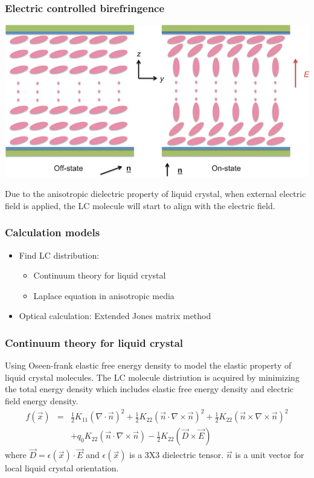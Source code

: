 \documentclass{beamer}
\begin{document}
\begin{frame}
\frametitle{Electric controlled birefringence}
\begin{center}
\includegraphics[scale=0.4]{ECB.jpg}
\end{center}
Due to the anisotropic dielectric property of liquid crystal, when external electric field is applied, the LC molecule will start to align with the electric field.
\end{frame}
\begin{frame}
\frametitle{Calculation models}
\begin{itemize}
\item<1-> Find LC distribution:
\begin{itemize}
\item<1-> Continuum theory for liquid crystal
\item<1-> Laplace equation in anisotropic media
\end{itemize}
\item<1-> Optical calculation: Extended Jones matrix method
\end{itemize}
\end{frame}
\begin{frame}
\frametitle{Continuum theory for liquid crystal}
Using Oseen-frank elastic free energy density to model the elastic property of liquid crystal molecules.
The LC molecule distriution is acquired by minimizing the total energy density which includes elastic free energy density and electric field energy density.
\begin{eqnarray}
f(\vec x) &=& \frac{1}{2}K_{11}(\nabla\cdot\vec n)^2+\frac{1}{2}K_{22}(\vec n\cdot\nabla\times\vec n)^2 + \frac{1}{2}K_{22}(\vec n\times\nabla\times\vec n)^2\nonumber \\
&&+q_0K_{22}(\vec n\cdot\nabla\times\vec n) - \frac{1}{2}K_{22}(\vec D\times\vec E)\nonumber
\label{eq:free_energy}
\end{eqnarray}
where $\vec D = \epsilon(\vec x)\cdot \vec E$ and $\epsilon(\vec x)$ is a 3X3 dielectric tensor. $\vec n$ is a unit vector for local liquid crystal orientation.
\end{frame}
\end{document}
